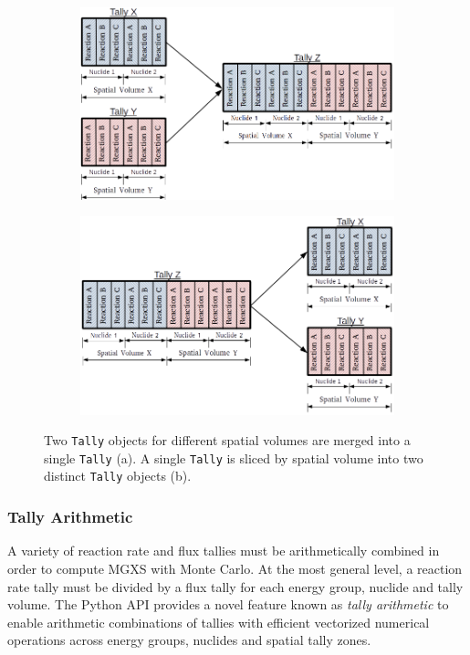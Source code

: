\begin{figure}
\begin{subfigure}{\textwidth}
  \centering
  \includegraphics[width=0.6\linewidth]{figures/tally-merge}
  \caption{}
\end{subfigure}
\begin{subfigure}{\textwidth}
  \centering
  \includegraphics[width=0.6\linewidth]{figures/tally-slice}
  \caption{}
\end{subfigure}
\caption{Two \texttt{Tally} objects for different spatial volumes are merged into a single \texttt{Tally} (a). A single \texttt{Tally} is sliced by spatial volume into two distinct \texttt{Tally} objects (b).}
\label{fig:tally-merge-slice}
\end{figure}

\subsubsection{Tally Arithmetic}
\label{subsubsec:tally-arithmetic}

A variety of reaction rate and flux tallies must be arithmetically combined in order to compute MGXS with Monte Carlo. At the most general level, a reaction rate tally must be divided by a flux tally for each energy group, nuclide and tally volume. The Python API provides a novel feature known as \emph{tally arithmetic} to enable arithmetic combinations of tallies with efficient vectorized numerical operations across energy groups, nuclides and spatial tally zones.

